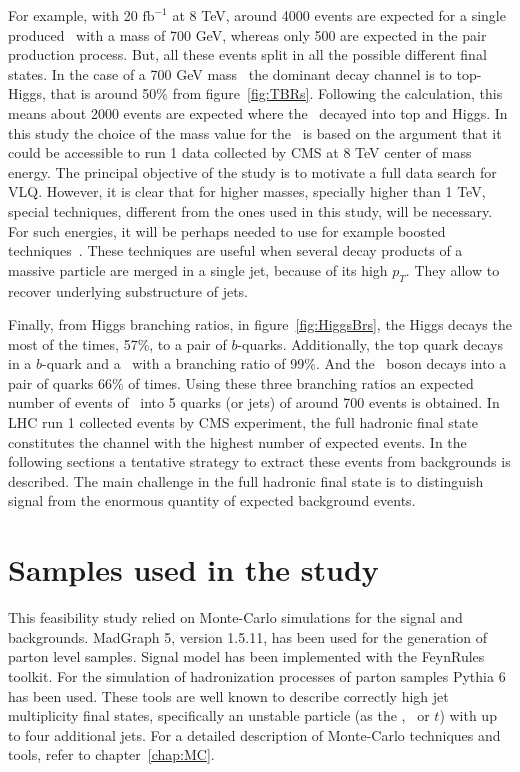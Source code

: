 For example, with 20 $\text{fb}^{-1}$ at 8 TeV, around 4000 events are expected for a single produced \Tp~with a mass of 700 GeV, whereas only 500 are expected in the pair production process. But, all these events split in all the possible different final states. In the case of a 700 GeV mass \Tp~the dominant decay channel is to top-Higgs, that is around 50\% from figure~\ref{fig:TBRs}. Following the calculation, this means about 2000 events are expected where the \Tp~decayed into top and Higgs. In this study the choice of the mass value for the \Tp~is based on the argument that it could be accessible to run 1 data collected by CMS at 8 TeV center of mass energy. The principal objective of the study is to motivate a full data search for VLQ. However, it is clear that for higher masses, specially higher than 1 TeV, special techniques, different from the ones used in this study, will be necessary. For such energies, it will be perhaps needed to use for example boosted techniques~\cite{CMS:2013vca, ATLAS-CONF-2013-084, Usai:2015vva}. These techniques are useful when several decay products of a massive particle are merged in a single jet, because of its high $p_{T}$. They allow to recover underlying substructure of jets.

Finally, from Higgs branching ratios, in figure~\ref{fig:HiggsBrs}, the Higgs decays the most of the times, 57\%, to a pair of $b$-quarks. Additionally, the top quark decays in a $b$-quark and a \W~with a branching ratio of 99\%. And the \W~boson decays into a pair of quarks 66\% of times. Using these three branching ratios an expected number of events of \Tp~into 5 quarks (or jets) of around 700 events is obtained. In LHC run 1 collected events by CMS experiment, the full hadronic final state constitutes the channel with the highest number of expected events. In the following sections a tentative strategy to extract these events from backgrounds is described. The main challenge in the full hadronic final state is to distinguish signal from the enormous quantity of expected background events.


\section{Samples used in the study}
\label{sec:PhenoSam}

This feasibility study relied on Monte-Carlo simulations for the signal and backgrounds. MadGraph 5, version 1.5.11, has been used for the generation of parton level samples. Signal model has been implemented with the FeynRules toolkit. For the simulation of hadronization processes of parton samples Pythia 6 has been used. These tools are well known to describe correctly high jet multiplicity final states, specifically an unstable particle (as the \W, \Z~or $t$) with up to four additional jets. For a detailed description of Monte-Carlo techniques and tools, refer to chapter~\ref{chap:MC}. 

